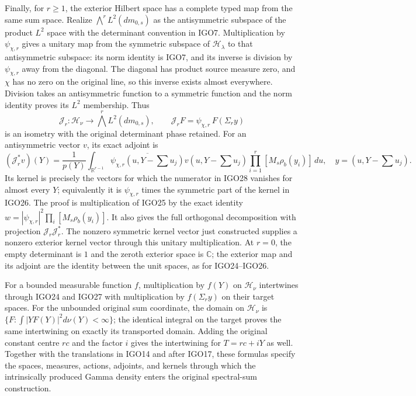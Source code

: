 \documentclass[11pt,a4paper]{article}
\begin{document}
Finally, for $r\geq1$, the exterior Hilbert space has a complete typed map
from the same sum space. Realize $\bigwedge^rL^2(dm_{0,s})$
as the antisymmetric subspace of the product $L^2$ space with
the determinant convention in IGO7. Multiplication by
$\psi_{\chi,r}$ gives a unitary map from the symmetric
subspace of $\mathcal H_\lambda$ to that antisymmetric
subspace: its norm identity is IGO7, and its inverse is
division by $\psi_{\chi,r}$ away from the diagonal. The
diagonal has product source measure zero, and $\chi$ has
no zero on the original line, so this inverse exists almost
everywhere. Division takes an antisymmetric function to a
symmetric function and the norm identity proves its $L^2$
membership. Thus
\[
 \mathcal J_r:\mathcal H_\nu\longrightarrow
                  \bigwedge^r L^2(dm_{0,s}),\qquad
 \mathcal J_rF=\psi_{\chi,r}\,F(\Sigma_r y)
 \tag{IGO27}
\]
is an isometry with the original determinant phase retained.
For an antisymmetric vector $v$, its exact adjoint is
\[
 (\mathcal J_r^*v)(Y)=\frac1{p(Y)}
 \int_{\mathbb R^{r-1}}
   \overline{\psi_{\chi,r}(u,Y-\textstyle\sum u_j)}
   v(u,Y-\textstyle\sum u_j)
   \prod_{i=1}^r[M_s\rho_b(y_i)]\,du,
 \quad y=(u,Y-\textstyle\sum u_j).
 \tag{IGO28}
\]
Its kernel is precisely the vectors for which the numerator
in IGO28 vanishes for almost every $Y$; equivalently it is
$\psi_{\chi,r}$ times the symmetric part of the kernel in
IGO26. The proof is multiplication of IGO25 by the exact
identity $w=|\psi_{\chi,r}|^2\prod_i[M_s\rho_b(y_i)]$.
It also gives the full orthogonal decomposition with
projection $\mathcal J_r\mathcal J_r^*$. The nonzero
symmetric kernel vector just constructed supplies a nonzero
exterior kernel vector through this unitary multiplication.
At $r=0$, the empty determinant is $1$ and the zeroth exterior
space is $\mathbb C$; the exterior map and its adjoint are the
identity between the unit spaces, as for IGO24--IGO26.

For a bounded measurable function $f$, multiplication by
$f(Y)$ on $\mathcal H_\nu$ intertwines through IGO24 and
IGO27 with multiplication by $f(\Sigma_r y)$ on their
target spaces. For the unbounded original sum coordinate,
the domain on $\mathcal H_\nu$ is
$\{F:\int |YF(Y)|^2d\nu(Y)<\infty\}$; the identical
integral on the target proves the same intertwining on
exactly its transported domain. Adding the original
constant centre $rc$ and the factor $i$ gives the
intertwining for $T=rc+iY$ as well. Together with the
translations in IGO14 and after IGO17, these formulas
specify the spaces, measures, actions, adjoints, and kernels
through which the intrinsically produced Gamma density
enters the original spectral-sum construction.
\end{document}
